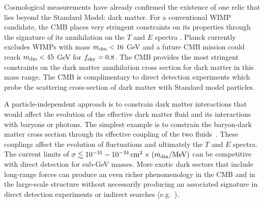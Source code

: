 Cosmological measurements have already confirmed the existence of one relic that lies beyond the 
Standard Model: dark matter. For a conventional WIMP candidate, the CMB places very stringent 
constraints on its properties through the signature of its annihilation on the $T$ and $E$ 
spectra \citep{Peebles2000, Chen2004, Padmanabhan2005}.  Planck currently excludes WIMPs with mass $m_{\rm dm}< 16$ GeV and a future CMB mission could reach $m_{\rm dm} < 45$ GeV for $f_{\rm sky} =0.8$.  The CMB provides the most stringent constraints on the dark matter annihilation cross section for dark matter in this mass range.  The CMB is complimentary to direct detection experiments which probe the scattering cross-section of dark matter with Standard model particles.


A particle-independent approach is to constrain dark matter interactions that would 
affect the evolution of the effective dark matter fluid and its interactions with baryons or photons.  The simplest example is 
to constrain the baryon-dark matter cross section through its effective coupling of the two fluids~\cite{Dvorkin:2013cea}.  
These couplings affect the evolution of fluctuations and ultimately the $T$ and $E$ spectra. The current limits of $\sigma \lesssim 10^{-31}-10^{-34}\,{\rm cm}^2 \times (m_{\rm dm} / {\rm MeV})$ can be competitive with direct detection for sub-GeV masses.  
More exotic dark sectors that include long-range forces can produce an even richer phenomenology in the CMB and in the large-scale structure 
without necessarily producing an associated signature in direct detection experiments or 
indirect searches (e.g.~\cite{Cyr-Racine:2013fsa,Buen-Abad:2015ova,Lesgourgues:2015wza}). 

